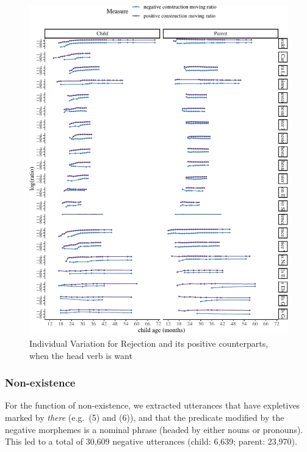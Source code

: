 \documentclass[
  english,
  man,floatsintext]{apa6}
\begin{document}
\begin{figure}[H]

{\centering \includegraphics{neg_construction_article_files/figure-latex/individualemotionwant-1} 

}

\caption{Individual Variation for  Rejection and its positive counterparts, when the head verb is want}\label{fig:individualemotionwant}
\end{figure}

\clearpage

\hypertarget{non-existence}{%
\subsubsection{Non-existence}\label{non-existence}}

For the function of non-existence, we extracted utterances that have expletives marked by \emph{there} (e.g.~(5) and (6)), and that the predicate modified by the negative morphemes is a nominal phrase (headed by either nouns or pronouns). This led to a total of 30,609 negative utterances (child: 6,639; parent: 23,970).
\end{document}
